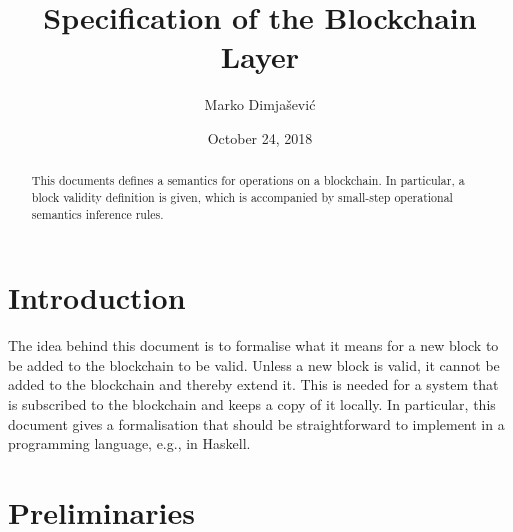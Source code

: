 \documentclass[11pt,a4paper]{article}
\begin{document}
\title{Specification of the Blockchain Layer}

\author{Marko Dimjašević}

\date{October 24, 2018}

\maketitle

\begin{abstract}
This documents defines a semantics for operations on a blockchain.
%
In particular, a block validity definition is given, which is accompanied by
small-step operational semantics inference rules.
\end{abstract}

\tableofcontents
\listoffigures

\section{Introduction}
\label{sec:introduction}

The idea behind this document is to formalise what it means for a new block to
be added to the blockchain to be valid.
%
Unless a new block is valid, it cannot be added to the blockchain and thereby
extend it.
%
This is needed for a system that is subscribed to the blockchain and keeps a
copy of it locally.
%
In particular, this document gives a formalisation that should be
straightforward to implement in a programming language, e.g., in Haskell.


\section{Preliminaries}
\label{sec:preliminaries}
\end{document}
